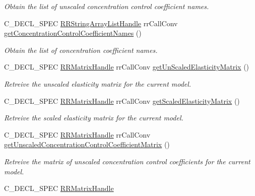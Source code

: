 \begin{DoxyCompactItemize}
\begin{DoxyCompactList}\small\item\em \-Obtain the list of unscaled concentration control coefficient names. \end{DoxyCompactList}\item 
\-C\-\_\-\-D\-E\-C\-L\-\_\-\-S\-P\-E\-C \*
\hyperlink{struct_r_r_string_array_list}{\-R\-R\-String\-Array\-List\-Handle} \*
rr\-Call\-Conv \hyperlink{group__utility_gac65874848b588a8c87ac04705eb88cbc}{get\-Concentration\-Control\-Coefficient\-Names} ()
\begin{DoxyCompactList}\small\item\em \-Obtain the list of concentration coefficient names. \end{DoxyCompactList}\item 
\-C\-\_\-\-D\-E\-C\-L\-\_\-\-S\-P\-E\-C \hyperlink{rr__c__types_8h_a87174eefa58ae98dec58c9253ae6c5da}{\-R\-R\-Matrix\-Handle} \*
rr\-Call\-Conv \hyperlink{group__utility_ga82cf39ff64eb0446c9f5a2e772283323}{get\-Un\-Scaled\-Elasticity\-Matrix} ()
\begin{DoxyCompactList}\small\item\em \-Retreive the unscaled elasticity matrix for the current model. \end{DoxyCompactList}\item 
\-C\-\_\-\-D\-E\-C\-L\-\_\-\-S\-P\-E\-C \hyperlink{rr__c__types_8h_a87174eefa58ae98dec58c9253ae6c5da}{\-R\-R\-Matrix\-Handle} \*
rr\-Call\-Conv \hyperlink{group__utility_gaf8431784ec5c2ce1d0416606056f3d44}{get\-Scaled\-Elasticity\-Matrix} ()
\begin{DoxyCompactList}\small\item\em \-Retreive the scaled elasticity matrix for the current model. \end{DoxyCompactList}\item 
\-C\-\_\-\-D\-E\-C\-L\-\_\-\-S\-P\-E\-C \hyperlink{rr__c__types_8h_a87174eefa58ae98dec58c9253ae6c5da}{\-R\-R\-Matrix\-Handle} \*
rr\-Call\-Conv \hyperlink{group__utility_ga418c0108d37bc4f35a55291ca85e0a3f}{get\-Unscaled\-Concentration\-Control\-Coefficient\-Matrix} ()
\begin{DoxyCompactList}\small\item\em \-Retreive the matrix of unscaled concentration control coefficients for the current model. \end{DoxyCompactList}\item 
\-C\-\_\-\-D\-E\-C\-L\-\_\-\-S\-P\-E\-C \hyperlink{rr__c__types_8h_a87174eefa58ae98dec58c9253ae6c5da}{\-R\-R\-Matrix\-Handle} \*

\end{DoxyCompactItemize}

